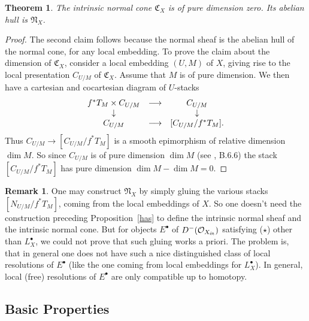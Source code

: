 \documentclass[11pt]{article}
\theoremstyle{plain}
\newtheorem{them}[prop]{Theorem}
\theoremstyle{definition}
\newtheorem{rmkp}{Remark}\renewcommand{\thermkp}{}
\newenvironment{rmk}{\begin{rmkp}\normalfont}{\end{rmkp}}
\newenvironment{pf}{\begin{proof}}{\end{proof}}
\newcommand{\et}{{\mbox{\tiny \'{e}t}}}
\newcommand{\upst}{^{\ast}}
\newcommand{\com}{^{\scriptscriptstyle\bullet}}
\newcommand{\NN}{{\mathfrak{N}}}
\newcommand{\CC}{{\mathfrak{C}}}
\renewcommand{\O}{{\mathcal{O}}}
\newcommand{\ldiag}[1]
       {\makebox[0cm]{\({\scriptstyle#1}\downarrow\phantom{\scriptstyle#1}\)}}
\newcommand{\rdiag}[1]
       {\makebox[0cm]{\(\phantom{\scriptstyle#1}\downarrow{\scriptstyle#1}\)}}
\newcommand{\comdia}[9]{
\begin{array}{ccc}
#1 & \stackrel{#2}{\longrightarrow} & #3 \\
\ldiag{#4} & #5 & \rdiag{#6} \\
#7 & \stackrel{#8}{\longrightarrow} & #9
\end{array}}
\theoremstyle{plain}
\theoremstyle{definition}
\theoremstyle{remark}
\begin{document}
\begin{them}
The intrinsic normal cone \(\CC_X\) is of pure dimension zero. Its
abelian hull is \(\NN_X\).
\end{them}
\begin{pf} The second claim follows because the normal sheaf is the abelian
hull of the normal cone, for any local embedding. To prove the claim
about the dimension of \(\CC_X\), consider a local embedding \((U,M)\) of
\(X\), giving rise to the local presentation \(C_{U/M}\) of
\(\CC_X\). Assume that \(M\) is of pure dimension.  We then have a
cartesian and cocartesian diagram of \(U\)-stacks
\[
\comdia{f\upst T_M\times C_{U/M}}{}{C_{U/M}}{}{}{}{C_{U/M}}{}{[C_{U/M}/f\upst
T_M].}
\]
Thus \({C_{U/M}}{\rightarrow}{[C_{U/M}/f\upst T_M]}\) is a
smooth epimorphism of relative dimension \(\dim M\). So since \(C_{U/M}\)
is of pure dimension \(\dim M\) (see \cite{fulton}, B.6.6) the stack
\([C_{U/M}/f\upst T_M]\) has pure dimension \(\dim M-\dim M=0\).
\end{pf}

\begin{rmk}
One may construct \(\NN_X\) by simply gluing the various stacks
\([N_{U/M}/f\upst T_M]\), coming from the local embeddings of \(X\). So
one doesn't need the construction preceding Proposition~\ref{has} to
define the intrinsic normal sheaf and the intrinsic normal cone. But
for objects \(E\com\) of \(D^-(\O_{X_\et})\) satisfying (\(\star\)) other
than \(L_X\com\), we could not prove that such gluing works a
priori. The problem is, that in general one does not have such a nice
distinguished class of local resolutions of \(E\com\) (like the one
coming from local embeddings for \(L_X\com\)). In general, local (free)
resolutions of \(E\com\) are only compatible up to homotopy.
\end{rmk}

\subsection{Basic Properties}
\end{document}
